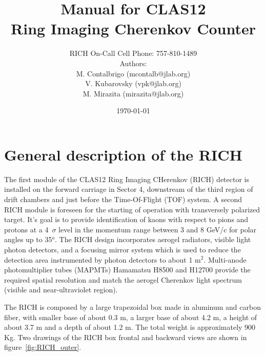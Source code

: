 \documentclass[12pt]{article}
\title{Manual for CLAS12 \\ Ring Imaging Cherenkov Counter}
\author{RICH On-Call Cell Phone: 757-810-1489 \\ 
Authors: \\
M. Contalbrigo (mcontalb@jlab.org) \\
V. Kubarovsky (vpk@jlab.org)\\
M. Mirazita (mirazita@jlab.org)\\
}
\date{\today} %
\begin{document}
\maketitle{}

\tableofcontents

\newpage
   \section{General description of the RICH}

The first module of the CLAS12 Ring Imaging CHerenkov (RICH) detector is installed on the forward carriage in Sector 4, downstream of the third region of drift chambers and just before the Time-Of-Flight (TOF) system.
A second RICH module is foreseen for the starting of operation with transversely polarized target.
It's goal is to provide identification of kaons with respect to pions and protons at a 4~$\sigma$ level in the momentum range between 3 and 8 GeV/c for polar angles up to 35$^o$.
The RICH design incorporates aerogel radiators, visible light photon detectors, and a focusing mirror system which is used to reduce the detection area instrumented by photon detectors to about 1 m$^2$. 
Multi-anode photomultiplier tubes (MAPMTs) Hamamatsu H8500 and H12700 provide the required spatial resolution and match the aerogel Cherenkov light spectrum (visible and near-ultraviolet region). 

The RICH is composed by a large trapezoidal box made in aluminum and carbon fiber, with smaller base of about 0.3 m, a larger base of about 4.2 m, a height of about 3.7 m and a depth of about 1.2 m. 
The total weight is approximately 900 Kg. 
Two drawings of the RICH box frontal and backward views are shown in figure~\ref{fig:RICH_outer}. 
\end{document}
